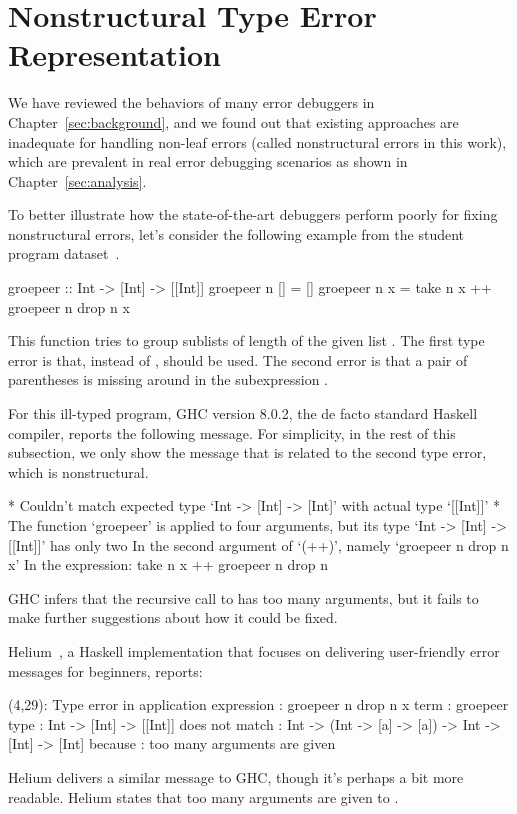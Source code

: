\documentclass[12pt]{report}	%
\begin{document}
\chapter{Nonstructural Type Error Representation}
\label{sec:features}

We have reviewed the behaviors of many error debuggers in Chapter~\ref{sec:background},
and we found out that existing approaches are inadequate for handling non-leaf errors (called nonstructural errors in this work), 
which are prevalent in real error debugging scenarios as shown in Chapter~\ref{sec:analysis}.

To better illustrate how the state-of-the-art debuggers perform poorly for fixing nonstructural errors, 
let's consider the following example from the student program dataset~\cite{Hage09:Neon}.
%
\begin{program}
groepeer :: Int -> [Int] -> [[Int]]
groepeer n [] = []
groepeer n x  = take n x ++ groepeer n drop n x
\end{program}
%
This function
tries to group sublists of length  of the given list .
The first type error is that, instead of \prog{++}, \prog{:}
should be used. The second
error is that 
a pair of parentheses
is missing around 
in the subexpression
.

For this ill-typed program, GHC version 8.0.2,
the de facto standard Haskell compiler,
reports the following message.
For simplicity, in the rest of this subsection,
we only show the message 
that is related to the second type error, which is nonstructural.
%
\begin{program}
* Couldn't match expected type `Int -> [Int] -> [Int]'
    with actual type `[[Int]]'
* The function `groepeer' is applied to four arguments,
    but its type `Int -> [Int] -> [[Int]]' has only two
    In the second argument of `(++)', namely `groepeer n drop n x'
    In the expression: take n x ++ groepeer n drop n
\end{program}
%
GHC infers that the recursive call to  has too many arguments,
but it fails to make further suggestions about how it could be fixed.

Helium~\cite{Heeren03:HLH}, a Haskell implementation that
focuses on delivering user-friendly error messages for
beginners, reports:
%
\begin{program}
(4,29): Type error in application
 expression       : groepeer n drop n x
 term             : groepeer
   type           : Int -> [Int]               -> [[Int]]
   does not match : Int -> (Int -> [a] -> [a]) -> Int -> [Int] -> [Int]
 because          : too many arguments are given
\end{program}
%
Helium delivers a similar message to GHC, though it's perhaps a bit more readable.
Helium states that too many arguments
are given to . 
\end{document}
